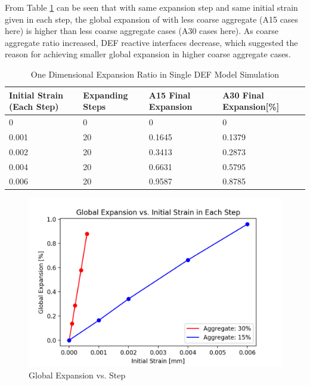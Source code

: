 From Table \ref{table:DEF_15vs30_EXP} can be seen that with same expansion step and same initial strain given in each step, the global expansion of with less coarse aggregate (A15 cases here) is higher than less coarse aggregate cases (A30 cases here).  As coarse aggregate ratio increased, DEF reactive interfaces decrease, which suggested the reason for achieving smaller global expansion in higher coarse aggregate cases.

\begin{table}[ht!]
\centering
\begin{tabular}{ ||p{2cm}|p{2cm}|p{2cm}|p{2cm}|| }
 \hline
    Initial Strain (Each Step) & Expanding Steps & A15 Final Expansion & A30 Final Expansion[\%] \\ [0.5ex]
 \hline\hline
  0 & 0 & 0 & 0 \\
  0.001 & 20 & 0.1645 & 0.1379\\
  0.002 & 20 & 0.3413 & 0.2873\\
  0.004 & 20 & 0.6631 & 0.5795\\
  0.006 & 20 & 0.9587 & 0.8785\\
 \hline
\end{tabular}
\caption{One Dimensional Expansion Ratio in Single DEF Model Simulation}
\label{table:DEF_15vs30_EXP}
\end{table}

\begin{figure}[ht!]
\centering
\includegraphics[width=.8\linewidth]{Files/exp_plot/DEFA30vsA15_exp.png}
  \caption{Global Expansion vs. Step}
  \label{fig:DEFA30vsA15_exp}
\end{figure}

